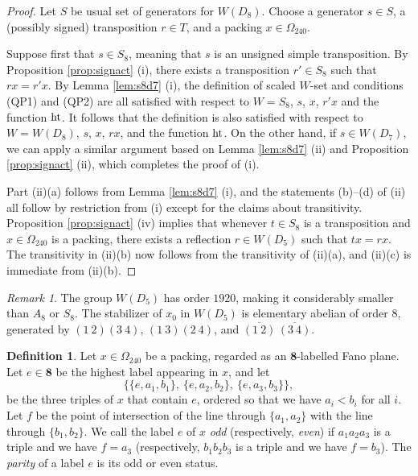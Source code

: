 \documentclass{amsart}
\theoremstyle{plain}
\theoremstyle{definition}
\newtheorem{defn}[theorem]{Definition}
\theoremstyle{remark}
\newtheorem{rmk}[theorem]{Remark}
\numberwithin{equation}{section}
\newcommand{\rootht}{\text{\rm ht}}
\newcommand{\eight}{{\mathbf 8}}
\newcommand{\qpx}{\Omega_{240}}
\begin{document}
\begin{proof}
Let $S$ be usual set of generators for $W(D_8)$. Choose a generator $s \in S$, a (possibly signed) transposition 
$r \in T$, and a packing $x \in \qpx$. 

Suppose first that $s \in S_8$, meaning that $s$ is an unsigned simple transposition. By Proposition \ref{prop:signact} (i), 
there exists a transposition $r' \in S_8$ such that $rx = r'x$. By Lemma \ref{lem:s8d7} (i), the definition of
scaled $W$-set and conditions (QP1) and (QP2) are all satisfied with respect to $W = S_8$, $s$, $x$, $r'x$
and the function $\rootht$. It follows that the definition is also satisfied with respect to $W = W(D_8)$, $s$, $x$,
$rx$, and the function $\rootht$. On the other hand, if $s \in W(D_7)$, we can apply a similar argument based on
Lemma \ref{lem:s8d7} (ii) and Proposition \ref{prop:signact} (ii), which completes the proof of (i).

Part (ii)(a) follows from Lemma \ref{lem:s8d7} (i), and the statements (b)--(d) of (ii) all follow by restriction 
from (i) except for the claims about transitivity. Proposition \ref{prop:signact} (iv) implies that whenever $t \in S_8$ 
is a transposition and $x \in \qpx$ is a packing, there exists a reflection $r \in W(D_5)$ such that $tx = rx$.
The transitivity in (ii)(b) now follows from the transitivity of (ii)(a), and (ii)(c) is immediate from (ii)(b).
\end{proof}

\begin{rmk}\label{rmk:d5stab}
The group $W(D_5)$ has order $1920$, making it considerably smaller than $A_8$ or $S_8$. The stabilizer of $x_0$ in 
$W(D_5)$ is elementary abelian of order $8$, generated by $(1\ 2)(3\ 4)$, $(1\ 3)(2\ 4)$, and 
$\overline{(1\ 2)}\,\overline{(3\ 4)}$. 
\end{rmk}

\begin{defn}\label{def:oddeven}
Let $x \in \qpx$ be a packing, regarded as an $\eight$-labelled Fano plane. Let $e \in \eight$ be the highest 
label appearing in $x$, and let $$
\{\{e, a_1, b_1\},\ \{e, a_2, b_2\}, \ \{e, a_3, b_3\}\}
,$$ be the three triples of $x$ that contain $e$, ordered so that we have $a_i < b_i$ for all $i$. Let $f$ be the
point of intersection of the line through $\{a_1, a_2\}$ with the line through $\{b_1, b_2\}$. We call the label
$e$ of $x$ {\it odd} (respectively, {\it even}) if $a_1 a_2 a_3$ is a triple and we have $f = a_3$ (respectively,
$b_1 b_2 b_3$ is a triple and we have $f = b_3$). The {\it parity} of a label $e$ is its odd or even status.
\end{defn}
\end{document}
